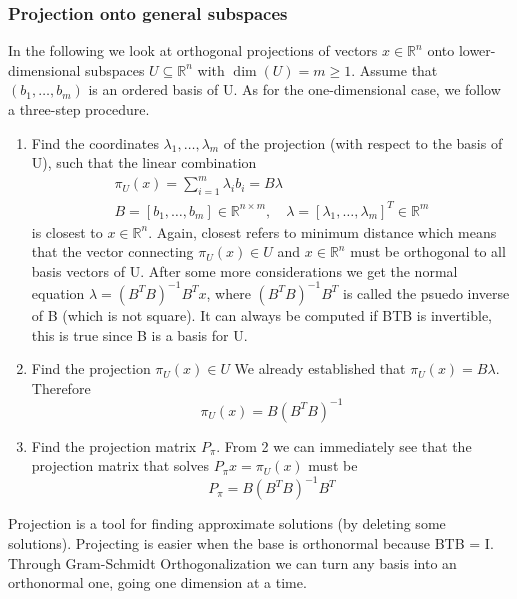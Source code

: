 \subsubsection{Projection onto general subspaces}
In the following we look at orthogonal projections of vectors $x \in \mathbb{R}^n$ onto lower-dimensional subspaces $U\subseteq \mathbb{R}^n$ with $\dim(U) = m \geq 1$. Assume that $(b_{1}, \ldots,b_{m})$ is an ordered basis of U. As for the one-dimensional case, we follow a three-step procedure. 
\begin{enumerate}
    \item Find the coordinates $\lambda_{1}, \ldots,\lambda_{m}$ of the projection (with respect to the basis of U), such that the linear combination
    \begin{align*}
        \pi_U(x) = \sum_{i=1}^{m}{\lambda_ib_i= B\lambda}\\
        B = [b_{1}, \ldots,b_{m}] \in \mathbb{R}^{n\times m}, \quad \lambda = [\lambda_{1}, \ldots,\lambda_{m}]^T \in \mathbb{R}^m
    \end{align*}
    is closest to $x \in \mathbb{R}^n$. Again, closest refers to minimum distance which means that the vector connecting $\pi_U(x) \in U$ and $x\in \mathbb{R}^n$ must be orthogonal to all basis vectors of U.
    After some more considerations we get the normal equation $\lambda = (B^TB)^{-1}B^Tx$, where $(B^TB)^{-1}B^T$ is called the psuedo inverse of B (which is not square). It can always be computed if BTB is invertible, this is true since B is a basis for U.
    \item Find the projection $\pi_U(x) \in U$ We already established that $\pi_U(x)=B\lambda$. Therefore
    \[ 
        \pi_U(x) = B(B^TB)^{-1} 
    \]
    \item Find the projection matrix $P_\pi$. From 2 we can immediately see that the projection matrix that solves $P_\pi x=\pi_U(x)$ must be 
    \[ 
        P_\pi=B(B^TB)^{-1}B^T 
    \]
\end{enumerate}
Projection is a tool for finding approximate solutions (by deleting some solutions). Projecting is easier when the base is orthonormal because BTB = I. Through Gram-Schmidt Orthogonalization we can turn any basis into an orthonormal one, going one dimension at a time.

